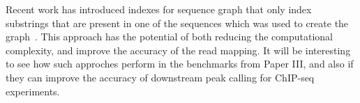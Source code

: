 Recent work has introduced indexes for sequence graph that only index substrings that are present in one of the sequences which was used to create the graph~\cite{haplotypeaware}.
This approach has the potential of both reducing the computational complexity, and improve the accuracy of the read mapping. It will be interesting to see how such approches perform in the benchmarks from Paper III, and also if they can improve the accuracy of downstream peak calling for ChIP-seq experiments.

